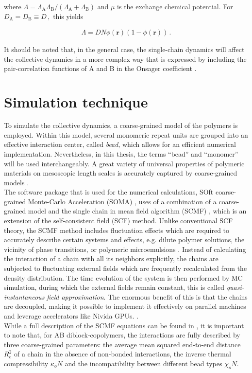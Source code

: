 \documentclass[bachelor,       %
               twoside,        %
               BCOR10mm,       %
                ngerman,english  %
               ]{GAUBM}
\begin{document}
where $\Lambda=\Lambda_\mathrm A\Lambda_\mathrm B/(\Lambda_\mathrm A+\Lambda_\mathrm B)$ and $\mu$ is the exchange chemical potential. For $D_\mathrm A=D_\mathrm B\equiv D\,,$ this yields

\begin{align}
  \Lambda=DN\phi(\mathbf{r})(1-\phi(\mathbf{r}))\,.
  \label{eq:onsager}
\end{align}


It should be noted that, in the general case, the single-chain dynamics will affect the collective dynamics in a more complex way that is expressed by including the pair-correlation functions of A and B in the Onsager coefficient \cite{Reister02}. 

\chapter{Simulation technique}

To simulate the collective dynamics, a coarse-grained model of the polymers is employed. Within this model, several monomeric repeat units are grouped into an effective interaction center, called \textit{bead}, which allows for an efficient numerical implementation. Nevertheless, in this thesis, the terms \enquote{bead} and \enquote{monomer} will be used interchangeably. A great variety of universal properties of polymeric materials on mesoscopic length scales is accurately captured by coarse-grained models \cite{Baschnagel03}.\\
The software package that is used for the numerical calculations, SOft coarse-grained Monte-Carlo Acceleration (SOMA) \cite{Schneider_soma}, uses of a combination of a coarse-grained model and the single chain in mean field algorithm (SCMF) \cite{Daoulas06}, which is an extension of the self-consistent field (SCF) method. Unlike conventional SCF theory, the SCMF method includes fluctuation effects which are required to accurately describe certain systems and effects, e.g. dilute polymer solutions, the vicinity of phase transitions, or polymeric microemulsions \cite{Bates97, Mueller02, Schmid03}. Instead of calculating the interaction of a chain with all its neighbors explicitly, the chains are subjected to fluctuating external fields which are frequently recalculated from the density distribution. The time evolution of the system is then performed by MC simulation, during which the external fields remain constant, this is called \textit{quasi-instantaneous field approximation}. The enormous benefit of this is that the chains are decoupled, making it possible to implement it effectively on parallel machines and leverage accelerators like Nivida GPUs. \cite{Schneider_soma}.\\
While a full description of the SCMF equations can be found in \cite{Daoulas06}, it is important to note that, for AB diblock-copolymers, the interactions are fully described by three coarse-grained parameters: the average mean squared end-to-end distance $R_{e}^2$ of a chain in the absence of non-bonded interactions, the inverse thermal compressibility $\kappa_o N$ and the incompatibility between different bead types $\chi_o N$. 
\end{document}
